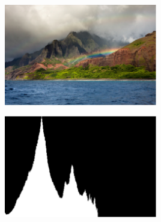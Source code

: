 \begin{figurehere}
 \centering
 \includegraphics[width=0.5\textwidth]{./pictures/bitmap}
 \label{fig:bitmap}
\end{figurehere}
\begin{figurehere}
 \centering
 \includegraphics[width=0.5\textwidth]{./pictures/lumhist}
 \label{fig:lumhist}
\end{figurehere}

